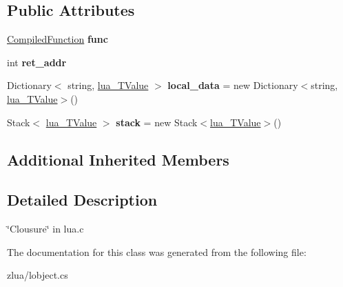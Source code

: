 \subsection*{Public Attributes}
\begin{DoxyCompactItemize}
\item 
\mbox{\label{classzlua_1_1_runtime_func_a753d0bf3e22f4ddc65048bdc65b2469c}} 
\mbox{\hyperlink{classzlua_1_1_compiled_function}{Compiled\+Function}} {\bfseries func}
\item 
\mbox{\label{classzlua_1_1_runtime_func_a99d3029f09035ff1ab70e717ad1022f8}} 
int {\bfseries ret\+\_\+addr}
\item 
\mbox{\label{classzlua_1_1_runtime_func_a154f0ae1f0b750a133a6db5ea5d564d7}} 
Dictionary$<$ string, \mbox{\hyperlink{classzlua_1_1lua___t_value}{lua\+\_\+\+T\+Value}} $>$ {\bfseries local\+\_\+data} = new Dictionary$<$string, \mbox{\hyperlink{classzlua_1_1lua___t_value}{lua\+\_\+\+T\+Value}}$>$()
\item 
\mbox{\label{classzlua_1_1_runtime_func_a995a6f394890d8c97135f74f8c90c65c}} 
Stack$<$ \mbox{\hyperlink{classzlua_1_1lua___t_value}{lua\+\_\+\+T\+Value}} $>$ {\bfseries stack} = new Stack$<$\mbox{\hyperlink{classzlua_1_1lua___t_value}{lua\+\_\+\+T\+Value}}$>$()
\end{DoxyCompactItemize}
\subsection*{Additional Inherited Members}


\subsection{Detailed Description}
\char`\"{}\+Clousure\char`\"{} in lua.\+c 



The documentation for this class was generated from the following file\+:\begin{DoxyCompactItemize}
\item 
zlua/lobject.\+cs\end{DoxyCompactItemize}
